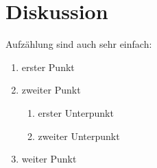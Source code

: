 
\chapter{Diskussion} %
\label{chap:diskussion}

Aufzählung sind auch sehr einfach:

\begin{enumerate}
    \item erster Punkt
    \item zweiter Punkt
    \begin{enumerate}
        \item erster Unterpunkt
        \item zweiter Unterpunkt
    \end{enumerate}
    \item weiter Punkt
\end{enumerate}

\blindtext

